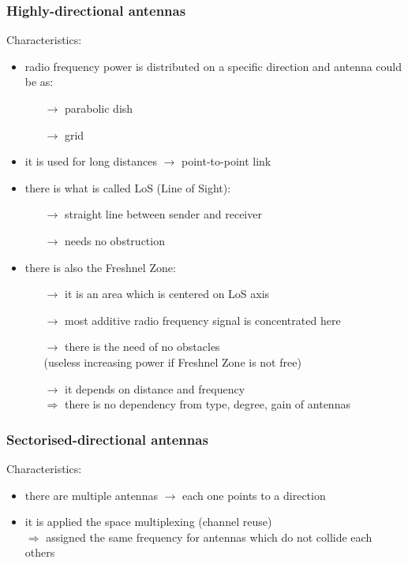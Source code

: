 \subsubsection{Highly-directional antennas}

Characteristics:
\begin{itemize}
    \item radio frequency power is distributed on a specific direction and antenna could be as:
    \begin{itemize}
        \item[$\rightarrow$] parabolic dish
        \item[$\rightarrow$] grid
    \end{itemize}
    \item it is used for long distances $\rightarrow$ point-to-point link
    \item there is what is called LoS (Line of Sight):
    \begin{itemize}
        \item[$\rightarrow$] straight line between sender and receiver
        \item[$\rightarrow$] needs no obstruction
    \end{itemize}
    \item there is also the Freshnel Zone:
    \begin{itemize}
        \item[$\rightarrow$] it is an area which is centered on LoS axis
        \item[$\rightarrow$] most additive radio frequency signal is concentrated here
        \item[$\rightarrow$] there is the need of no obstacles\\ (useless increasing power if Freshnel Zone is not free)
        \item[$\rightarrow$] it depends on distance and frequency\\ $\Rightarrow$ there is no dependency from type, degree, gain of antennas
    \end{itemize}
\end{itemize}
\newpage
\subsubsection{Sectorised-directional antennas}

Characteristics:
\begin{itemize}
    \item there are multiple antennas $\rightarrow$ each one points to a direction
    \item it is applied the space multiplexing (channel reuse)\\ $\Rightarrow$ assigned the same frequency for antennas which do not collide each others 
\end{itemize}